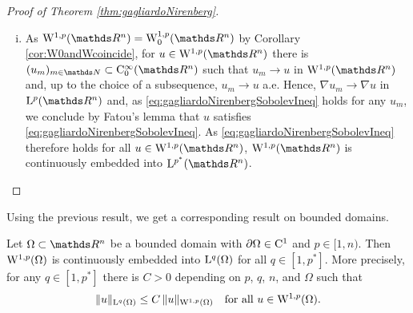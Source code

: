 \begin{proof}[Proof of Theorem \ref{thm:gagliardoNirenberg}]
\begin{enumerate}[i)]
    \item As $\WW^{1,p}(\R^n) = \WW_0^{1,p}(\R^n)$ by Corollary \ref{cor:W0andWcoincide}, for $u \in \WW^{1,p}(\R^n)$ there is $(u_m)_{m \in \N} \subset \CC_0^\infty(\R^n)$ such that $u_m \to u$ in $\WW^{1,p}(\R^n)$ and, up to the choice of a subsequence, $u_m \to u$ a.e.
      Hence, $\nabla u_m \to \nabla u$ in $\Ell^p(\R^n)$ and, as \eqref{eq:gagliardoNirenbergSobolevIneq} holds for any $u_m$, we conclude by Fatou's lemma that $u$ satisfies \eqref{eq:gagliardoNirenbergSobolevIneq}.
      As \eqref{eq:gagliardoNirenbergSobolevIneq} therefore holds for all $u \in \WW^{1,p}(\R^n)$, $\WW^{1,p}(\R^n)$ is continuously embedded into $\Ell^{p^*}(\R^n)$. \qedhere
  \end{enumerate}
\end{proof}

Using the previous result, we get a corresponding result on bounded domains.

\begin{thm}
  \label{thm:embeddingpltn}
  Let $\Omega \subset \R^n$ be a bounded domain with $\partial\Omega \in \mathrm{C}^1$ and $p \in [1,n)$.
    Then $\mathrm{W}^{1,p}(\Omega)$ is continuously embedded into $\mathrm{L}^q(\Omega)$ for all $q \in [1,p^*]$.
    More precisely, for any $q \in [1,p^*]$ there is $C > 0$ depending on $p$, $q$, $n$, and $\Omega$ such that
    \begin{equation}
      \label{eq:embeddingForpltn}
      \|u\|_{\mathrm{L}^q(\Omega)} \leq C \, \| u\|_{\mathrm{W}^{1,p}(\Omega)} \quad\text{for all } u \in \mathrm{W}^{1,p}(\Omega).
    \end{equation}
\end{thm}

